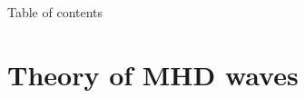 \documentclass{beamer}
\begin{document}
\begin{frame}{Table of contents}
    \tableofcontents
\end{frame}
\section{Theory of MHD waves}
\end{document}
